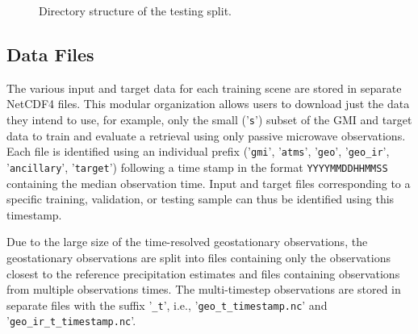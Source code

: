 \documentclass[11pt]{article}
\begin{document}
\begin{figure}[htbp] %


	\caption{
		Directory structure of the testing split.
	}
	\label{fig:testing_organization}
\end{figure}

\subsection{Data Files}

The various input and target data for each training scene are stored in separate
NetCDF4 files. This modular organization allows users to download just the data
they intend to use, for example, only the small ('\texttt{s}') subset of the GMI
and target data to train and evaluate a retrieval using only passive microwave
observations. Each file is identified using an individual prefix
('\texttt{gmi}', '\texttt{atms}', '\texttt{geo}', '\texttt{geo\_ir}',
'\texttt{ancillary}', '\texttt{target}') following a time stamp in the format
\texttt{YYYYMMDDHHMMSS} containing the median observation time. Input and target
files corresponding to a specific training, validation, or testing sample can
thus be identified using this timestamp.

Due to the large size of the time-resolved geostationary observations, the
geostationary observations are split into files containing only the observations
closest to the reference precipitation estimates and files containing
observations from multiple observations times. The multi-timestep observations
are stored in separate files with the suffix '\texttt{\_t}', i.e.,
'\texttt{geo\_t\_\textlangle timestamp\textrangle.nc}' and '\texttt{geo\_ir\_t\_\textlangle timestamp\textrangle.nc}'.
\end{document}

